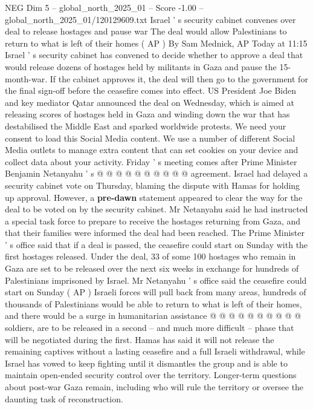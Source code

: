 \begin{textsample}{NEG Dim 5 – global\_north\_2025\_01 – Score -1.00 – global\_north\_2025\_01/120129609.txt}  \label{ex:f5_neg_183}
Israel ' s security cabinet convenes over deal to release hostages and pause war The deal would allow Palestinians to return to what is left of their homes ( AP ) By Sam Mednick, AP Today at 11:15 Israel ' s security cabinet has convened to decide whether to approve a deal that would release dozens of hostages held by militants in Gaza and pause the 15-month-war.
If the cabinet approves it, the deal will then go to the government for the final sign-off before the ceasefire comes into effect.
US President Joe Biden and key mediator Qatar announced the deal on Wednesday, which is aimed at releasing scores of hostages held in Gaza and winding down the war that has destabilised the Middle East and sparked worldwide protests.
We need your consent to load this Social Media content.
We use a number of different Social Media outlets to manage extra content that can set cookies on your device and collect data about your activity.
Friday ' s meeting comes after Prime Minister Benjamin Netanyahu ' s @ @ @ @ @ @ @ @ @ @ agreement.
Israel had delayed a security cabinet vote on Thursday, blaming the dispute with Hamas for holding up approval.
However, a \textbf{pre-dawn} statement appeared to clear the way for the deal to be voted on by the security cabinet.
Mr Netanyahu said he had instructed a special task force to prepare to receive the hostages returning from Gaza, and that their families were informed the deal had been reached.
The Prime Minister ' s office said that if a deal is passed, the ceasefire could start on Sunday with the first hostages released.
Under the deal, 33 of some 100 hostages who remain in Gaza are set to be released over the next six weeks in exchange for hundreds of Palestinians imprisoned by Israel.
Mr Netanyahu ' s office said the ceasefire could start on Sunday ( AP ) Israeli forces will pull back from many areas, hundreds of thousands of Palestinians would be able to return to what is left of their homes, and there would be a surge in humanitarian assistance @ @ @ @ @ @ @ @ @ @ soldiers, are to be released in a second -- and much more difficult -- phase that will be negotiated during the first.
Hamas has said it will not release the remaining captives without a lasting ceasefire and a full Israeli withdrawal, while Israel has vowed to keep fighting until it dismantles the group and is able to maintain open-ended security control over the territory.
Longer-term questions about post-war Gaza remain, including who will rule the territory or oversee the daunting task of reconstruction.

\end{textsample}
